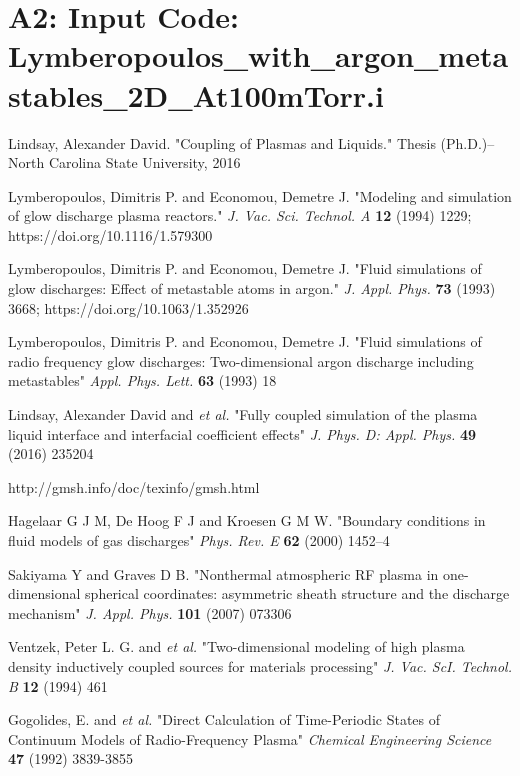 \documentclass[final]{report}
\begin{document}
  \section*{A2: Input Code:\\
  Lymberopoulos\_with\_argon\_metastables\_2D\_At100mTorr.i}
  


\begin{thebibliography}{9}
 Lindsay, Alexander David. "Coupling of Plasmas and Liquids." Thesis (Ph.D.)--North Carolina State University, 2016

 Lymberopoulos, Dimitris P. and Economou, Demetre J. "Modeling and simulation of glow discharge plasma reactors." \textit{J. Vac. Sci. Technol. A} \textbf{12} (1994) 1229; https://doi.org/10.1116/1.579300

Lymberopoulos, Dimitris P. and Economou, Demetre J. "Fluid simulations of glow discharges: Effect of metastable atoms in argon." \textit{J. Appl. Phys.} \textbf{73} (1993) 3668; https://doi.org/10.1063/1.352926

 Lymberopoulos, Dimitris P. and Economou, Demetre J. "Fluid simulations of radio frequency glow discharges: Two-dimensional argon discharge including metastables" \textit{Appl. Phys. Lett.} \textbf{63} (1993) 18

 Lindsay, Alexander David and \textit{et al.} "Fully coupled simulation of the plasma liquid interface and interfacial coefficient effects" \textit{J. Phys. D: Appl. Phys.} \textbf{49} (2016) 235204

 http://gmsh.info/doc/texinfo/gmsh.html

 Hagelaar G J M, De Hoog F J and Kroesen G M W. "Boundary conditions in fluid models of gas discharges" \textit{Phys. Rev. E} \textbf{62} (2000) 1452–4

 Sakiyama Y and Graves D B. "Nonthermal atmospheric RF plasma in one-dimensional spherical coordinates: asymmetric sheath structure and the discharge mechanism" \textit{J. Appl. Phys.} \textbf{101} (2007) 073306

 Ventzek, Peter L. G. and \textit{et al.} "Two-dimensional modeling of high plasma density inductively coupled sources for materials processing" \textit{J. Vac. ScI. Technol. B} \textbf{12} (1994) 461

 Gogolides, E. and \textit{et al.} "Direct Calculation of Time-Periodic States of Continuum Models of Radio-Frequency Plasma" \textit{Chemical Engineering Science} \textbf{47} (1992) 3839-3855
\end{thebibliography}
\end{document}
